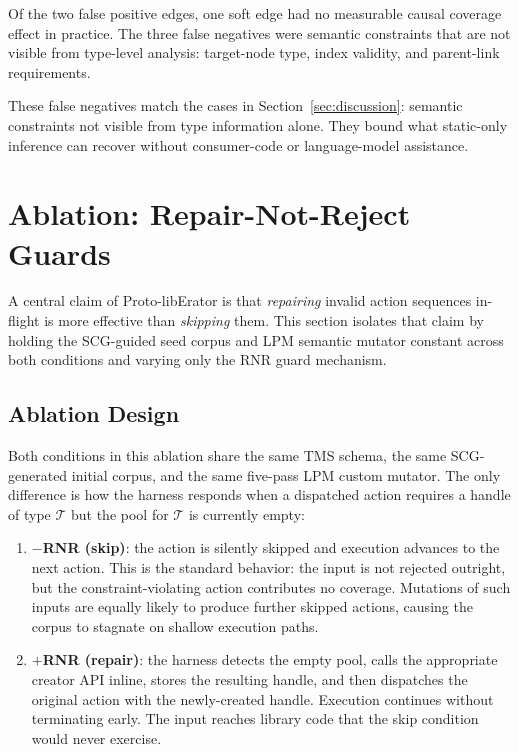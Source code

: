 Of the two false positive edges, one soft edge had no measurable causal
coverage effect in practice. The three false negatives were semantic
constraints that are not visible from type-level analysis: target-node type,
index validity, and parent-link requirements.

These false negatives match the cases in Section~\ref{sec:discussion}:
semantic constraints not visible from type information alone.
They bound what static-only inference can recover without consumer-code
or language-model assistance.

\section{Ablation: Repair-Not-Reject Guards}
\label{sec:eval_rnr_ablation}

A central claim of Proto-libErator is that \emph{repairing} invalid
action sequences in-flight is more effective than \emph{skipping} them.
This section isolates that claim by holding the SCG-guided seed corpus
and LPM semantic mutator constant across both conditions and varying
only the RNR guard mechanism.

\subsection{Ablation Design}
\label{sec:eval_rnr_design}

Both conditions in this ablation share the same TMS schema, the same
SCG-generated initial corpus, and the same five-pass LPM custom mutator.
The only difference is how the harness responds when a dispatched action
requires a handle of type $\mathcal{T}$ but the pool for $\mathcal{T}$
is currently empty:

\begin{enumerate}[leftmargin=*, label=(\roman*)]
  \item \textbf{$-$RNR (skip)}: the action is silently skipped and
    execution advances to the next action.  This is the standard
    behavior: the input is not rejected outright, but the
    constraint-violating action contributes no coverage.  Mutations of
    such inputs are equally likely to produce further skipped actions,
    causing the corpus to stagnate on shallow execution paths.
  \item \textbf{$+$RNR (repair)}: the harness detects the empty pool,
    calls the appropriate creator API inline, stores the resulting
    handle, and then dispatches the original action with the
    newly-created handle.  Execution continues without terminating early.
    The input reaches library code that the skip condition would never
    exercise.
\end{enumerate}

